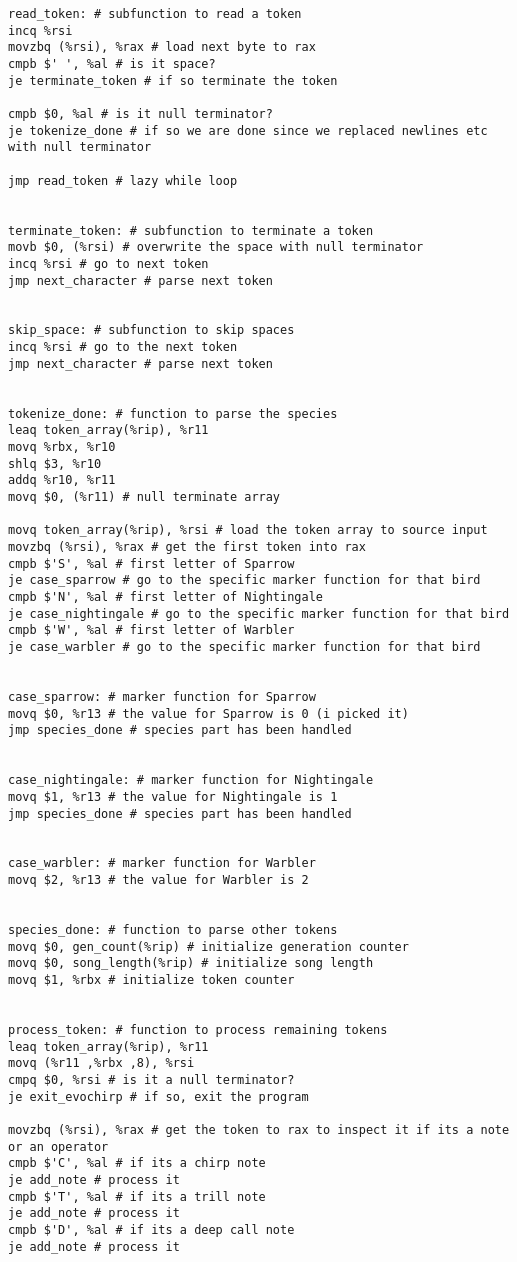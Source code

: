 \documentclass[a4paper,12pt]{article}
\begin{document}
\begin{lstlisting}[style=ATnTStyle]
read_token: # subfunction to read a token
incq %rsi
movzbq (%rsi), %rax # load next byte to rax
cmpb $' ', %al # is it space?
je terminate_token # if so terminate the token

cmpb $0, %al # is it null terminator?
je tokenize_done # if so we are done since we replaced newlines etc with null terminator

jmp read_token # lazy while loop


terminate_token: # subfunction to terminate a token
movb $0, (%rsi) # overwrite the space with null terminator
incq %rsi # go to next token
jmp next_character # parse next token


skip_space: # subfunction to skip spaces
incq %rsi # go to the next token
jmp next_character # parse next token


tokenize_done: # function to parse the species
leaq token_array(%rip), %r11
movq %rbx, %r10
shlq $3, %r10
addq %r10, %r11
movq $0, (%r11) # null terminate array

movq token_array(%rip), %rsi # load the token array to source input
movzbq (%rsi), %rax # get the first token into rax
cmpb $'S', %al # first letter of Sparrow
je case_sparrow # go to the specific marker function for that bird
cmpb $'N', %al # first letter of Nightingale
je case_nightingale # go to the specific marker function for that bird
cmpb $'W', %al # first letter of Warbler
je case_warbler # go to the specific marker function for that bird


case_sparrow: # marker function for Sparrow
movq $0, %r13 # the value for Sparrow is 0 (i picked it)
jmp species_done # species part has been handled


case_nightingale: # marker function for Nightingale
movq $1, %r13 # the value for Nightingale is 1
jmp species_done # species part has been handled


case_warbler: # marker function for Warbler
movq $2, %r13 # the value for Warbler is 2


species_done: # function to parse other tokens
movq $0, gen_count(%rip) # initialize generation counter
movq $0, song_length(%rip) # initialize song length
movq $1, %rbx # initialize token counter


process_token: # function to process remaining tokens
leaq token_array(%rip), %r11
movq (%r11 ,%rbx ,8), %rsi
cmpq $0, %rsi # is it a null terminator?
je exit_evochirp # if so, exit the program

movzbq (%rsi), %rax # get the token to rax to inspect it if its a note or an operator
cmpb $'C', %al # if its a chirp note
je add_note # process it
cmpb $'T', %al # if its a trill note
je add_note # process it
cmpb $'D', %al # if its a deep call note
je add_note # process it


\end{lstlisting}
\end{document}

